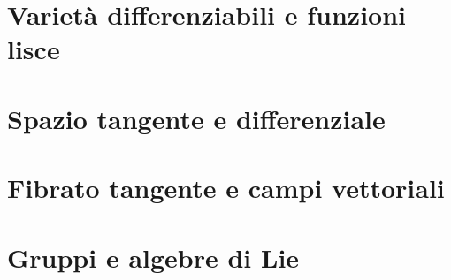 


    \section{Varietà differenziabili e funzioni lisce}
       

    \section{Spazio tangente e differenziale}
       

    \section{Fibrato tangente e campi vettoriali}
       

    \section{Gruppi e algebre di Lie}
       


